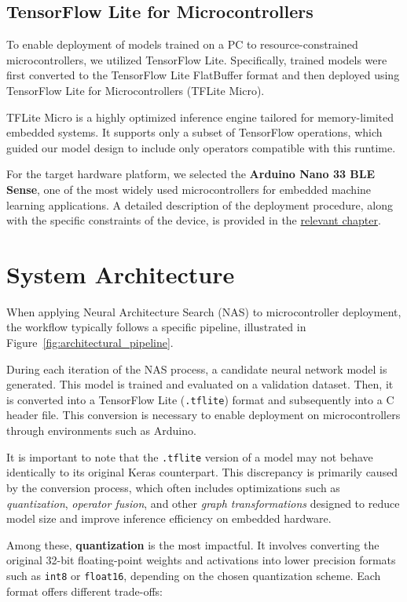 \subsection*{TensorFlow Lite for Microcontrollers}

To enable deployment of models trained on a PC to resource-constrained microcontrollers, we utilized TensorFlow Lite. Specifically, trained models were first converted to the TensorFlow Lite FlatBuffer format and then deployed using TensorFlow Lite for Microcontrollers (TFLite Micro).

TFLite Micro is a highly optimized inference engine tailored for memory-limited embedded systems. It supports only a subset of TensorFlow operations, which guided our model design to include only operators compatible with this runtime.

For the target hardware platform, we selected the \textbf{Arduino Nano 33 BLE Sense}, one of the most widely used microcontrollers for embedded machine learning applications. A detailed description of the deployment procedure, along with the specific constraints of the device, is provided in the \hyperref[chap:DeploymentEnvironment]{relevant chapter}.

\section{System Architecture}

When applying Neural Architecture Search (NAS) to microcontroller deployment, the workflow typically follows a specific pipeline, illustrated in Figure~\ref{fig:architectural_pipeline}.

During each iteration of the NAS process, a candidate neural network model is generated. This model is trained and evaluated on a validation dataset. Then, it is converted into a TensorFlow Lite (\texttt{.tflite}) format and subsequently into a C header file. This conversion is necessary to enable deployment on microcontrollers through environments such as Arduino.

It is important to note that the \texttt{.tflite} version of a model may not behave identically to its original Keras counterpart. This discrepancy is primarily caused by the conversion process, which often includes optimizations such as \textit{quantization}, \textit{operator fusion}, and other \textit{graph transformations} designed to reduce model size and improve inference efficiency on embedded hardware.

Among these, \textbf{quantization} is the most impactful. It involves converting the original 32-bit floating-point weights and activations into lower precision formats such as \texttt{int8} or \texttt{float16}, depending on the chosen quantization scheme. Each format offers different trade-offs:

